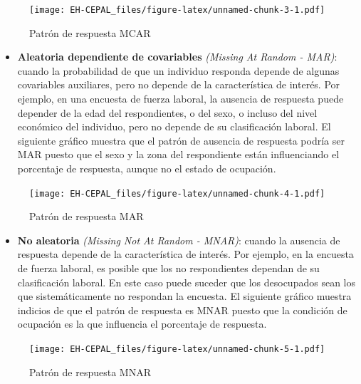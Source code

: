 \documentclass[12pt,spanish,]{book}
\providecommand{\tightlist}{%
  \setlength{\itemsep}{0pt}\setlength{\parskip}{0pt}}
\begin{document}
\begin{figure}
\centering
\texttt{[image: EH-CEPAL\_files/figure-latex/unnamed-chunk-3-1.pdf]}
\caption{\label{fig:unnamed-chunk-3}Patrón de respuesta MCAR}
\end{figure}

\begin{itemize}
\tightlist
\item
  \textbf{Aleatoria dependiente de covariables} \emph{(Missing At Random - MAR)}: cuando la probabilidad de que un individuo responda depende de algunas covariables auxiliares, pero no depende de la característica de interés. Por ejemplo, en una encuesta de fuerza laboral, la ausencia de respuesta puede depender de la edad del respondientes, o del sexo, o incluso del nivel económico del individuo, pero no depende de su clasificación laboral. El siguiente gráfico muestra que el patrón de ausencia de respuesta podría ser MAR puesto que el sexo y la zona del respondiente están influenciando el porcentaje de respuesta, aunque no el estado de ocupación.
\end{itemize}

\begin{figure}
\centering
\texttt{[image: EH-CEPAL\_files/figure-latex/unnamed-chunk-4-1.pdf]}
\caption{\label{fig:unnamed-chunk-4}Patrón de respuesta MAR}
\end{figure}

\begin{itemize}
\tightlist
\item
  \textbf{No aleatoria} \emph{(Missing Not At Random - MNAR)}: cuando la ausencia de respuesta depende de la característica de interés. Por ejemplo, en la encuesta de fuerza laboral, es posible que los no respondientes dependan de su clasificación laboral. En este caso puede suceder que los desocupados sean los que sistemáticamente no respondan la encuesta. El siguiente gráfico muestra indicios de que el patrón de respuesta es MNAR puesto que la condición de ocupación es la que influencia el porcentaje de respuesta.
\end{itemize}

\begin{figure}
\centering
\texttt{[image: EH-CEPAL\_files/figure-latex/unnamed-chunk-5-1.pdf]}
\caption{\label{fig:unnamed-chunk-5}Patrón de respuesta MNAR}
\end{figure}
\end{document}
